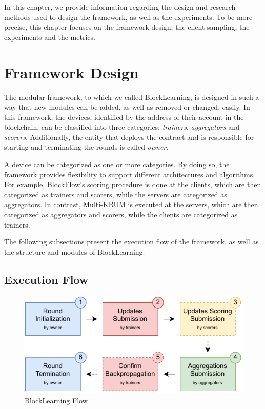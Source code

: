 In this chapter, we provide information regarding the design and research methods used to design the framework, as well as the experiments. To be more precise, this chapter focuses on the framework design, the client sampling, the experiments and the metrics.

\section{Framework Design}\label{meth:framework_design}

The modular framework, to which we called BlockLearning, is designed in such a way that new modules can be added, as well as removed or changed, easily. In this framework, the devices, identified by the address of their account in the blockchain, can be classified into three categories: \textit{trainers}, \textit{aggregators} and \textit{scorers}. Additionally, the entity that deploys the contract and is responsible for starting and terminating the rounds is called \textit{owner}.

A device can be categorized as one or more categories. By doing so, the framework provides flexibility to support different architectures and algorithms. For example, BlockFlow's scoring procedure is done at the clients, which are then categorized as trainers and scorers, while the servers are categorized as aggregators. In contrast, Multi-KRUM is executed at the servers, which are then categorized as aggregators and scorers, while the clients are categorized as trainers.

The following subsections present the execution flow of the framework, as well as the structure and modules of BlockLearning.

\subsection{Execution Flow}\label{meth:exec_flow}

\begin{figure}[!ht]
    \centering
    \includegraphics[width=1\textwidth]{graphics/sequence.pdf}
    \caption{BlockLearning Flow}
    \label{fig:blocklearning_steps}
\end{figure}


